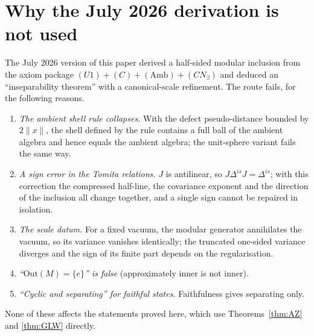 \section{Why the July 2026 derivation is not used}\label{app:july}

The July 2026 version of this paper derived a half-sided modular inclusion from the
axiom package \((U1)+(C)+(\mathrm{Amb})+(CN_\exists)\) and deduced an
``inseparability theorem'' with a canonical-scale refinement. The route fails, for the
following reasons.
\begin{enumerate}[leftmargin=2em,itemsep=2pt]
\item \emph{The ambient shell rule collapses.} With the defect pseudo-distance bounded by
\(2\|x\|\), the shell defined by the rule contains a full ball of the ambient algebra
and hence equals the ambient algebra; the unit-sphere variant fails the same way.
\item \emph{A sign error in the Tomita relations.} \(J\) is antilinear, so
\(J\Delta^{is}J=\Delta^{is}\); with this correction the compressed half-line, the
covariance exponent and the direction of the inclusion all change together, and a single
sign cannot be repaired in isolation.
\item \emph{The scale datum.} For a fixed vacuum, the modular generator annihilates
the vacuum, so its variance vanishes identically; the truncated one-sided variance
diverges and the sign of its finite part depends on the regularisation.
\item \emph{``\(\mathrm{Out}(M)=\{e\}\)'' is false} (approximately inner is not inner).
\item \emph{``Cyclic and separating'' for faithful states.} Faithfulness gives
separating only.
\end{enumerate}
None of these affects the statements proved here, which use Theorems~\ref{thm:AZ} and
\ref{thm:GLW} directly.

